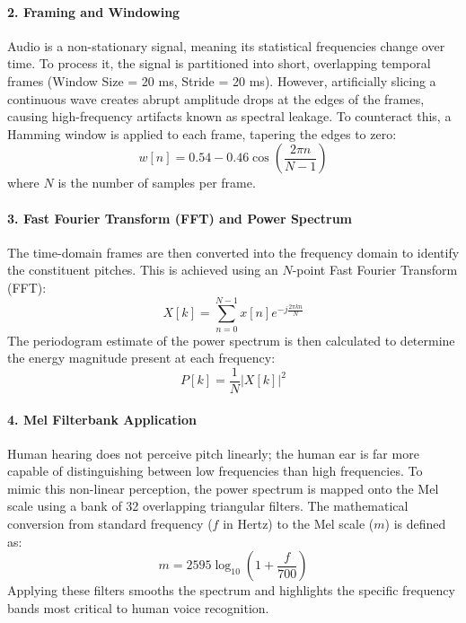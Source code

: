 \documentclass[11pt,a4paper,openany]{book}
\begin{document}
\paragraph{2. Framing and Windowing}
Audio is a non-stationary signal, meaning its statistical frequencies change over time. To process it, the signal is partitioned into short, overlapping temporal frames (Window Size = 20 ms, Stride = 20 ms). However, artificially slicing a continuous wave creates abrupt amplitude drops at the edges of the frames, causing high-frequency artifacts known as spectral leakage. To counteract this, a Hamming window is applied to each frame, tapering the edges to zero:
\begin{equation}
w[n] = 0.54 - 0.46 \cos\left(\frac{2\pi n}{N-1}\right)
\end{equation}
where $N$ is the number of samples per frame.

\paragraph{3. Fast Fourier Transform (FFT) and Power Spectrum}
The time-domain frames are then converted into the frequency domain to identify the constituent pitches. This is achieved using an $N$-point Fast Fourier Transform (FFT):
\begin{equation}
X[k] = \sum_{n=0}^{N-1} x[n] e^{-j \frac{2\pi k n}{N}}
\end{equation}
The periodogram estimate of the power spectrum is then calculated to determine the energy magnitude present at each frequency:
\begin{equation}
P[k] = \frac{1}{N} |X[k]|^2
\end{equation}

\paragraph{4. Mel Filterbank Application}
Human hearing does not perceive pitch linearly; the human ear is far more capable of distinguishing between low frequencies than high frequencies. To mimic this non-linear perception, the power spectrum is mapped onto the Mel scale using a bank of 32 overlapping triangular filters. The mathematical conversion from standard frequency ($f$ in Hertz) to the Mel scale ($m$) is defined as:
\begin{equation}
m = 2595 \log_{10}\left(1 + \frac{f}{700}\right)
\end{equation}
Applying these filters smooths the spectrum and highlights the specific frequency bands most critical to human voice recognition.
\end{document}
